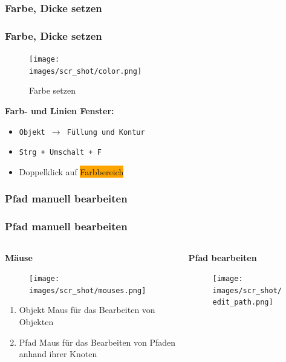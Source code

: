 \documentclass[german]{beamer} %
\newcommand{\images}{vektorzeichnen/}
\begin{document}

\subsubsection{Farbe, Dicke setzen}
\begin{frame}
  \frametitle{Farbe, Dicke setzen}

  \begin{figure}
  	\centering
    \texttt{[image: \\images/scr\_shot/color.png]}
    \caption{Farbe setzen}
    \label{fig:inkscape_scr_shot_color}
  \end{figure}
      
  \textbf{Farb- und Linien Fenster:}
  \begin{itemize}
  	\item \texttt{Objekt $\rightarrow$ Füllung und Kontur}
  	\item \texttt{Strg + Umschalt + F}
	\item Doppelklick auf \colorbox{orange}{Farbbereich}
  \end{itemize} 
  
 \end{frame}
 

\subsubsection{Pfad manuell bearbeiten}
\begin{frame}[t]
  \frametitle{Pfad manuell bearbeiten}
  
  \begin{columns}[t]
  	\begin{column}{0.4\textwidth}
  		\textbf{Mäuse}
  		\begin{figure}
  		   \centering
  			\texttt{[image: \\images/scr\_shot/mouses.png]}
  			\label{fig:inkscape_scr_shot_mouses}
  		\end{figure}
  		\begin{enumerate}
  			\item Objekt Maus für das Bearbeiten von Objekten
  			\item Pfad Maus für das Bearbeiten von Pfaden anhand ihrer Knoten
  		\end{enumerate}
  	\end{column}
  	
  	\begin{column}{0.6\textwidth}
  	\textbf{Pfad bearbeiten}
  		\begin{figure}
  			\centering
  			\texttt{[image: \\images/scr\_shot/edit\_path.png]}
  			\label{fig:inkscape_scr_shot_edit_path}
  		\end{figure}
  	\end{column}
  \end{columns}
  
 \end{frame}
 
\end{document}
